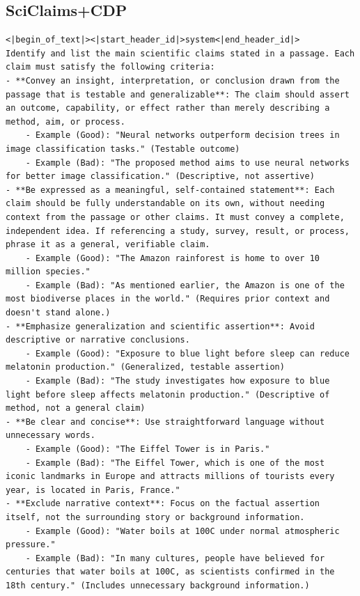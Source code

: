 \documentclass[11pt]{article}
\begin{document}
\subsection{SciClaims+CDP}
\begin{lstlisting}[breaklines=true, columns=flexible, basicstyle=\footnotesize]
<|begin_of_text|><|start_header_id|>system<|end_header_id|>
Identify and list the main scientific claims stated in a passage. Each claim must satisfy the following criteria:
- **Convey an insight, interpretation, or conclusion drawn from the passage that is testable and generalizable**: The claim should assert an outcome, capability, or effect rather than merely describing a method, aim, or process.
    - Example (Good): "Neural networks outperform decision trees in image classification tasks." (Testable outcome)
    - Example (Bad): "The proposed method aims to use neural networks for better image classification." (Descriptive, not assertive)
- **Be expressed as a meaningful, self-contained statement**: Each claim should be fully understandable on its own, without needing context from the passage or other claims. It must convey a complete, independent idea. If referencing a study, survey, result, or process, phrase it as a general, verifiable claim.
    - Example (Good): "The Amazon rainforest is home to over 10 million species."
    - Example (Bad): "As mentioned earlier, the Amazon is one of the most biodiverse places in the world." (Requires prior context and doesn't stand alone.)
- **Emphasize generalization and scientific assertion**: Avoid descriptive or narrative conclusions.
    - Example (Good): "Exposure to blue light before sleep can reduce melatonin production." (Generalized, testable assertion)
    - Example (Bad): "The study investigates how exposure to blue light before sleep affects melatonin production." (Descriptive of method, not a general claim)
- **Be clear and concise**: Use straightforward language without unnecessary words.
    - Example (Good): "The Eiffel Tower is in Paris."
    - Example (Bad): "The Eiffel Tower, which is one of the most iconic landmarks in Europe and attracts millions of tourists every year, is located in Paris, France."
- **Exclude narrative context**: Focus on the factual assertion itself, not the surrounding story or background information.
    - Example (Good): "Water boils at 100C under normal atmospheric pressure."
    - Example (Bad): "In many cultures, people have believed for centuries that water boils at 100C, as scientists confirmed in the 18th century." (Includes unnecessary background information.)

\end{lstlisting}
\end{document}
